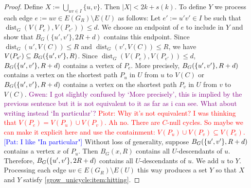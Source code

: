 \documentclass{patmorin}
\newcommand{\pat}[1]{\textcolor{Blue}{[Pat: #1]}}
\newcommand{\gwen}[1]{\textcolor{Purple}{Gwen: #1}}
\newcommand{\piotr}[1]{\textcolor{red}{Piotr: #1}}
\DeclareMathOperator{\dist}{dist}
\DeclarePairedDelimiter\set{\{}{\}}
\begin{document}
\begin{proof}
  Define $X:=\bigcup_{uv\in I}\{u,v\}$.  Then $|X|< 2k+s(k)$.  To define $Y$ we process each edge $e:=uv\in E(G_R)\setminus E(U)$ as follows: Let $e':=u'v'\in I$ be such that $\dist_G(V(P_{e}),V(P_{e'}))\le d$.  We choose an endpoint of $e$ to include in $Y$ and show that $B_G(\{u',v'\}, 2R+d)$ contains this endpoint. 
  Since $\dist_G(u',V(C))\leq R$ and $\dist_G(v',V(C))\leq R$,
  we have $V(P_{e'}) \subseteq B_G(\set{u',v'},R)$. Since $\dist_G(V(P_e),V(P_{e'}))\le d$,  $B_G(\set{u',v'},R+d)$ contains a vertex of $P_e$.
  More precisely, $B_G(\set{u',v'},R+d)$ contains a vertex on the shortest path $P_u$ in $U$ from $u$ to $V(C)$ or $B_G(\set{u',v'},R+d)$ contains a vertex on the shortest path $P_v$ in $U$ from $v$ to $V(C)$.  
  \gwen{I got slightly confused by `More precisely', this is implied by the previous sentence but it is not equivalent to it as far as i can see. What about writing instead `In particular'?}
  \piotr{Why it's not equivalent? I was thinking that $V(P_e)=V(P_u)\cup V(P_v)$. Ah no. There are $C$-null cycles. So maybe we can make it explicit here and use the containment: $V(P_u)\cup V(P_v)\subseteq V(P_e)$.}  \pat{I like "In particular"}
  Without loss of generality, suppose $B_G(\set{u',v'},R+d)$ contains a vertex $x$ of $P_u$.  Then $B_G(x,R)$ contains all $U$-descendants of $u$.  Therefore, $B_{G}(\set{u',v'},2R+d)$ contains all $U$-descendants of $u$.  We add $u$ to $Y$. Processing each edge $uv\in E(G_R)\setminus E(U)$ this way produces a set $Y$ so that $X$ and $Y$ satisfy \cref{grow_unicycle:item:hitting}.
\end{proof}


\end{document}
